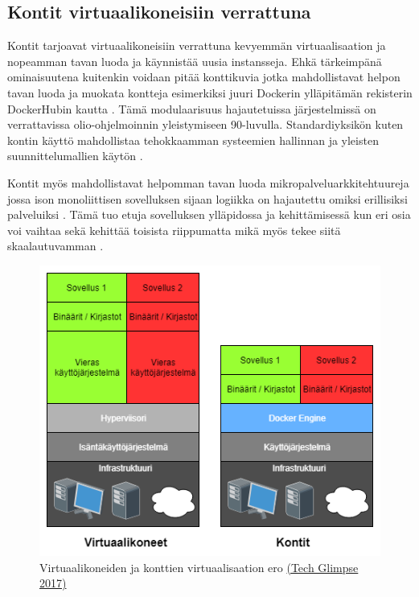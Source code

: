 \documentclass[finnish]{tktltiki2}
\theoremstyle{definition}
\theoremstyle{remark}
\begin{document}
\subsection{Kontit virtuaalikoneisiin verrattuna}

Kontit tarjoavat virtuaalikoneisiin verrattuna kevyemmän virtuaalisaation ja nopeamman tavan luoda ja käynnistää uusia instansseja. Ehkä tärkeimpänä ominaisuutena kuitenkin voidaan pitää konttikuvia jotka mahdollistavat helpon tavan luoda ja muokata kontteja esimerkiksi juuri Dockerin ylläpitämän rekisterin DockerHubin kautta \cite{docker}. Tämä modulaarisuus hajautetuissa järjestelmissä on verrattavissa olio-ohjelmoinnin yleistymiseen 90-luvulla. Standardiyksikön kuten kontin käyttö mahdollistaa tehokkaamman systeemien hallinnan ja yleisten suunnittelumallien käytön \cite{container-design-patterns}.

Kontit myös mahdollistavat helpomman tavan luoda mikropalveluarkkitehtuureja jossa ison monoliittisen sovelluksen sijaan logiikka on hajautettu omiksi erillisiksi palveluiksi \cite{practical-container, container-design-patterns}. Tämä tuo etuja sovelluksen ylläpidossa ja kehittämisessä kun eri osia voi vaihtaa sekä kehittää toisista riippumatta mikä myös tekee siitä skaalautuvamman \cite{goto-netflix}.

\begin{figure}[h]
    \centering
    \includegraphics[width=1\textwidth]{images/Container-vs-VMs.png}
    \caption{Virtuaalikoneiden ja konttien virtuaalisaation ero \href{https://techglimpse.com/docker-installation-tutorial-centos/}{(Tech Glimpse 2017)}}
    \label{fig:c-vs-vm}
\end{figure}
\end{document}
